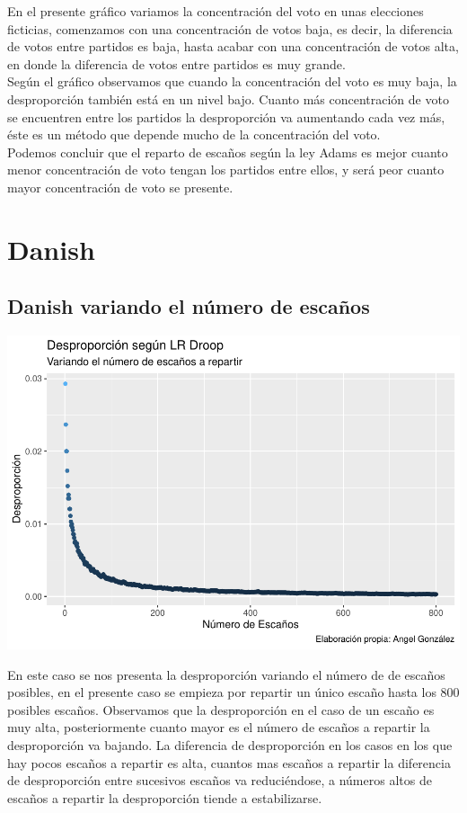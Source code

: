 \documentclass[12pt,a4paper,]{book}
\numberwithin{dummy}{section}
\theoremstyle{ocrenumbox}
\theoremstyle{blacknumex}
\theoremstyle{blacknumbox}
\theoremstyle{ocrenum}
\theoremstyle{ocrenum}
\begin{document}
En el presente gráfico variamos la concentración del voto en unas
elecciones ficticias, comenzamos con una concentración de votos baja, es
decir, la diferencia de votos entre partidos es baja, hasta acabar con
una concentración de votos alta, en donde la diferencia de votos entre
partidos es muy grande.\\
Según el gráfico observamos que cuando la concentración del voto es muy
baja, la desproporción también está en un nivel bajo. Cuanto más
concentración de voto se encuentren entre los partidos la desproporción
va aumentando cada vez más, éste es un método que depende mucho de la
concentración del voto.\\
Podemos concluir que el reparto de escaños según la ley Adams es mejor
cuanto menor concentración de voto tengan los partidos entre ellos, y
será peor cuanto mayor concentración de voto se presente.

\hypertarget{danish}{%
\section{Danish}\label{danish}}

\hypertarget{danish-variando-el-nuxfamero-de-escauxf1os}{%
\subsection{Danish variando el número de
escaños}\label{danish-variando-el-nuxfamero-de-escauxf1os}}

\begin{center}\includegraphics[width=0.95\linewidth]{figurasR/unnamed-chunk-46-1} \end{center}

En este caso se nos presenta la desproporción variando el número de de
escaños posibles, en el presente caso se empieza por repartir un único
escaño hasta los 800 posibles escaños. Observamos que la desproporción
en el caso de un escaño es muy alta, posteriormente cuanto mayor es el
número de escaños a repartir la desproporción va bajando. La diferencia
de desproporción en los casos en los que hay pocos escaños a repartir es
alta, cuantos mas escaños a repartir la diferencia de desproporción
entre sucesivos escaños va reduciéndose, a números altos de escaños a
repartir la desproporción tiende a estabilizarse.
\end{document}
